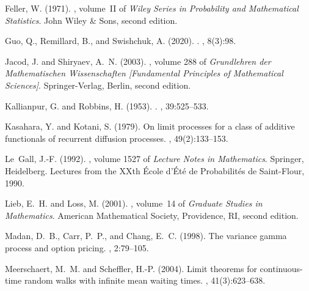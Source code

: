 \documentclass[final]{amsart}
\theoremstyle{definition}
\numberwithin{equation}{section}
\begin{document}
\begin{thebibliography}{}
Feller, W. (1971).
,
  volume~II of {\em Wiley Series in Probability and Mathematical Statistics}.
\newblock John Wiley \& Sons, second edition.

Guo, Q., Remillard, B., and Swishchuk, A. (2020).
.
, 8(3):98.

Jacod, J. and Shiryaev, A.~N. (2003).
, volume 288 of {\em
  Grundlehren der Mathematischen Wissenschaften [Fundamental Principles of
  Mathematical Sciences]}.
\newblock Springer-Verlag, Berlin, second edition.

Kallianpur, G. and Robbins, H. (1953).
.
, 39:525--533.

Kasahara, Y. and Kotani, S. (1979).
\newblock On limit processes for a class of additive functionals of recurrent
  diffusion processes.
, 49(2):133--153.

Le~Gall, J.-F. (1992).
, volume 1527 of {\em
  Lecture Notes in Mathematics}.
\newblock Springer, Heidelberg.
\newblock Lectures from the XXth \'{E}cole d'\'{E}té de Probabilités de
  Saint-Flour, 1990.

Lieb, E.~H. and Loss, M. (2001).
, volume~14 of {\em Graduate Studies in Mathematics}.
\newblock American Mathematical Society, Providence, RI, second edition.

Madan, D.~B., Carr, P.~P., and Chang, E.~C. (1998).
\newblock The variance gamma process and option pricing.
, 2:79--105.

Meerschaert, M.~M. and Scheffler, H.-P. (2004).
\newblock Limit theorems for continuous-time random walks with infinite mean
  waiting times.
, 41(3):623--638.


\end{thebibliography}
\end{document}
